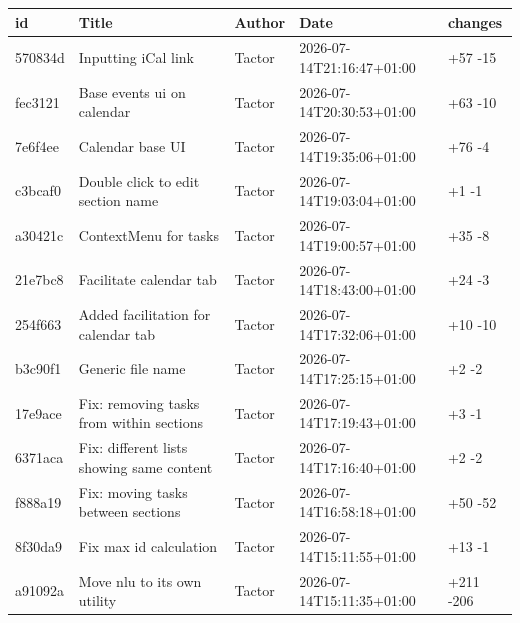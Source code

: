 \documentclass[11pt,a4paper]{full-example-report}
\begin{document}
\noindent
\begin{table}[h]
\centering
\begin{tabularx}{\textwidth}{lllll}
\textbf{id} & \textbf{Title} & \textbf{Author} & \textbf{Date} & \textbf{changes} \\ \midrule
570834d & Inputting iCal link & Tactor & 2026-07-14T21:16:47+01:00 & \textcolor{insertion}{+57} \textcolor{deletion}{-15} \\ \hline
fec3121 & Base events ui on calendar & Tactor & 2026-07-14T20:30:53+01:00 & \textcolor{insertion}{+63} \textcolor{deletion}{-10} \\ \hline
7e6f4ee & Calendar base UI & Tactor & 2026-07-14T19:35:06+01:00 & \textcolor{insertion}{+76} \textcolor{deletion}{-4} \\ \hline
c3bcaf0 & Double click to edit section name & Tactor & 2026-07-14T19:03:04+01:00 & \textcolor{insertion}{+1} \textcolor{deletion}{-1} \\ \hline
a30421c & ContextMenu for tasks & Tactor & 2026-07-14T19:00:57+01:00 & \textcolor{insertion}{+35} \textcolor{deletion}{-8} \\ \hline
21e7bc8 & Facilitate calendar tab & Tactor & 2026-07-14T18:43:00+01:00 & \textcolor{insertion}{+24} \textcolor{deletion}{-3} \\ \hline
254f663 & Added facilitation for calendar tab & Tactor & 2026-07-14T17:32:06+01:00 & \textcolor{insertion}{+10} \textcolor{deletion}{-10} \\ \hline
b3c90f1 & Generic file name & Tactor & 2026-07-14T17:25:15+01:00 & \textcolor{insertion}{+2} \textcolor{deletion}{-2} \\ \hline
17e9ace & Fix: removing tasks from within sections & Tactor & 2026-07-14T17:19:43+01:00 & \textcolor{insertion}{+3} \textcolor{deletion}{-1} \\ \hline
6371aca & Fix: different lists showing same content & Tactor & 2026-07-14T17:16:40+01:00 & \textcolor{insertion}{+2} \textcolor{deletion}{-2} \\ \hline
f888a19 & Fix: moving tasks between sections & Tactor & 2026-07-14T16:58:18+01:00 & \textcolor{insertion}{+50} \textcolor{deletion}{-52} \\ \hline
8f30da9 & Fix max id calculation & Tactor & 2026-07-14T15:11:55+01:00 & \textcolor{insertion}{+13} \textcolor{deletion}{-1} \\ \hline
a91092a & Move nlu to its own utility & Tactor & 2026-07-14T15:11:35+01:00 & \textcolor{insertion}{+211} \textcolor{deletion}{-206} \\ \hline

\end{tabularx}
\end{table}
\end{document}
